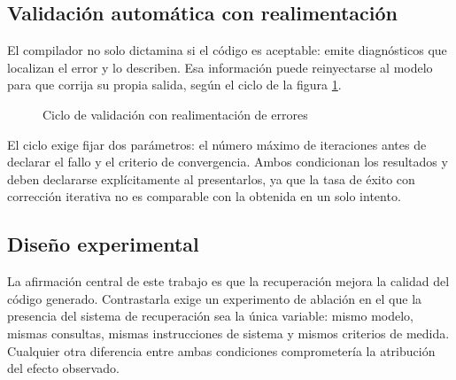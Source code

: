 \subsection{Validación automática con realimentación}

El compilador no solo dictamina si el código es aceptable: emite diagnósticos
que localizan el error y lo describen. Esa información puede reinyectarse al
modelo para que corrija su propia salida, según el ciclo de la figura
\ref{fig:ciclo-validacion}.

\begin{figure}[H]
  \centering
  \caption{Ciclo de validación con realimentación de errores}
  \label{fig:ciclo-validacion}
\end{figure}

El ciclo exige fijar dos parámetros: el número máximo de iteraciones antes de
declarar el fallo y el criterio de convergencia. Ambos condicionan los
resultados y deben declararse explícitamente al presentarlos, ya que la tasa de
éxito con corrección iterativa no es comparable con la obtenida en un solo
intento.

\subsection{Diseño experimental}

La afirmación central de este trabajo es que la recuperación mejora la calidad
del código generado. Contrastarla exige un experimento de ablación en el que la
presencia del sistema de recuperación sea la única variable: mismo modelo,
mismas consultas, mismas instrucciones de sistema y mismos criterios de medida.
Cualquier otra diferencia entre ambas condiciones comprometería la atribución
del efecto observado.

